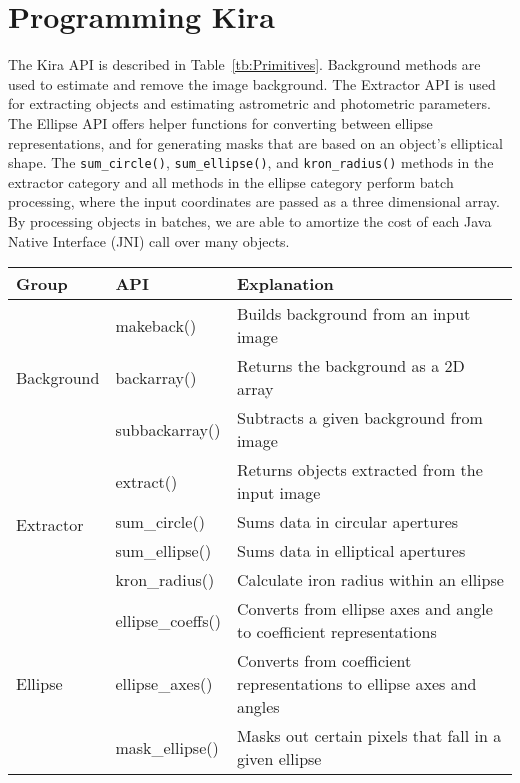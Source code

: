 \documentclass[conference]{IEEEtran}
\begin{document}
\section{Programming Kira}
\label{sec:Programming}
The Kira API is described
in Table~\ref{tb:Primitives}. Background methods are used to estimate and remove the image background. The Extractor
API is used for extracting objects and estimating astrometric and photometric parameters. The Ellipse API offers helper
functions for converting between ellipse representations, and for generating masks that are based on an object's elliptical
shape. The \texttt{sum\_circle()}, \texttt{sum\_ellipse()}, and \texttt{kron\_radius()} methods in the extractor category and all
methods in the ellipse category perform batch processing, where the input coordinates are passed as a three dimensional array. By processing objects
in batches, we are able to amortize the cost of each Java Native Interface (JNI) call over many objects.

\begin{table*}[t]
\begin{center}
\caption{Kira Primitives and Explanation}
\label{tb:Primitives}
\begin{tabular}{ |l|l|l| }
\hline
Group & API & Explanation \\ \hline \hline
\multirow{3}{*}{Background} & makeback() & Builds background from an input image \\
 & backarray() & Returns the background as a 2D array \\
 & subbackarray() & Subtracts a given background from image \\ \hline
\multirow{4}{*}{Extractor} & extract() & Returns objects extracted from the input image \\
 & sum\_circle() & Sums data in circular apertures \\
 & sum\_ellipse() & Sums data in elliptical apertures \\ 
 & kron\_radius() & Calculate iron radius within an ellipse \\ \hline
\multirow{3}{*}{Ellipse} & ellipse\_coeffs() & Converts from ellipse axes and angle to coefficient representations \\
 & ellipse\_axes() & Converts from coefficient representations to ellipse axes and angles \\ 
 & mask\_ellipse() & Masks out certain pixels that fall in a given ellipse \\ \hline
\end{tabular}
\end{center}
\end{table*}
\end{document}
